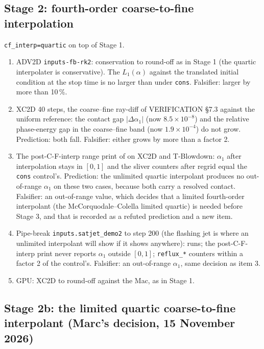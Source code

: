 \documentclass[11pt,a4paper]{article}
\newcommand{\code}[1]{\texttt{\small #1}}
\begin{document}
\subsection*{Stage 2: fourth-order coarse-to-fine interpolation}

\code{cf\_interp=quartic} on top of Stage 1.

\begin{enumerate}[nosep]
\item ADV2D \code{inputs-fb-rk2}: conservation to round-off as in Stage 1
      (the quartic interpolater is conservative).  The $L_1(\alpha)$
      against the translated initial condition at the stop time is no
      larger than under \code{cons}.  Falsifier: larger by more than 10\,\%.
\item XC2D 40 steps, the coarse--fine ray-diff of VERIFICATION \S7.3
      against the uniform reference: the contact gap $|\Delta\alpha_1|$
      (now $8.5\times10^{-8}$) and the relative phase-energy gap in the
      coarse--fine band (now $1.9\times10^{-4}$) do not grow.  Prediction:
      both fall.  Falsifier: either grows by more than a factor 2.
\item The post-C-F-interp range print of  on XC2D and
      T-Blowdown: $\alpha_1$ after interpolation stays in $[0,1]$ and the
      sliver counters after regrid equal the \code{cons} control's.
      Prediction: the unlimited quartic interpolant produces no
      out-of-range $\alpha_1$ on these two cases, because both carry a
      resolved contact.  Falsifier: an out-of-range value, which decides
      that a limited fourth-order interpolant (the McCorquodale--Colella
      limited quartic) is needed before Stage 3, and that is recorded as a
      refuted prediction and a new item.
\item Pipe-break \code{inputs.satjet\_demo2} to step 200 (the flashing jet
      is where an unlimited interpolant will show if it shows anywhere):
      runs; the post-C-F-interp print never reports $\alpha_1$ outside
      $[0,1]$; \code{reflux\_*} counters within a factor 2 of the control's.
      Falsifier: an out-of-range $\alpha_1$, same decision as item 3.
\item GPU: XC2D to round-off against the Mac, as in Stage 1.
\end{enumerate}

\subsection*{Stage 2b: the limited quartic coarse-to-fine interpolant (Marc's decision, 15 November 2026)}
\end{document}
